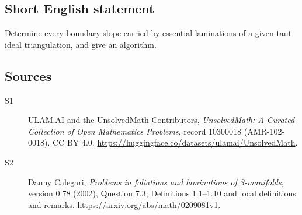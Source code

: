 \documentclass[11pt]{article}
\begin{document}
\subsection{Short English statement}
Determine every boundary slope carried by essential laminations of a given taut ideal triangulation, and give an algorithm.
\subsection{Sources}
\begin{description}
\item[\hypertarget{source:10300018:1}{S1}] ULAM.AI and the UnsolvedMath Contributors, \emph{UnsolvedMath: A Curated Collection of Open Mathematics Problems}, record 10300018 (AMR-102-0018). CC BY 4.0. \url{https://huggingface.co/datasets/ulamai/UnsolvedMath}.
\item[\hypertarget{source:10300018:2}{S2}] Danny Calegari, \emph{Problems in foliations and laminations of 3-manifolds}, version 0.78 (2002), Question 7.3; Definitions 1.1--1.10 and local definitions and remarks. \url{https://arxiv.org/abs/math/0209081v1}.
\end{description}
\label{end:10300018}
\end{document}

